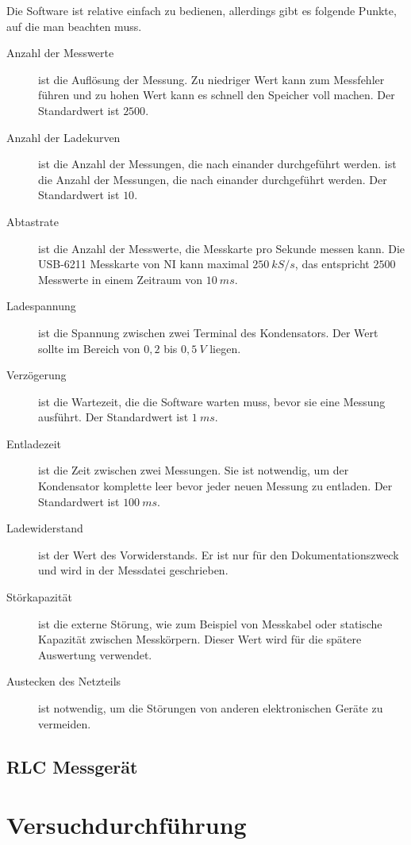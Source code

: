 Die Software ist relative einfach zu bedienen, allerdings gibt es folgende Punkte, auf die man beachten muss.
\begin{description}
    \item[Anzahl der Messwerte] ist die Auflösung der Messung.
        Zu niedriger Wert kann zum Messfehler führen und zu hohen Wert kann es schnell den Speicher voll machen.
        Der Standardwert ist $2500$.

    \item[Anzahl der Ladekurven] ist die Anzahl der Messungen, die nach einander durchgeführt werden. ist die Anzahl der Messungen, die nach einander durchgeführt werden.
        Der Standardwert ist $10$.

    \item[Abtastrate] ist die Anzahl der Messwerte, die Messkarte pro Sekunde messen kann.
        Die USB-6211 Messkarte von NI kann maximal $250 \ kS/s$, das entspricht $2500$ Messwerte in einem Zeitraum von $10 \ ms$.

    \item[Ladespannung] ist die Spannung zwischen zwei Terminal des Kondensators.
        Der Wert sollte im Bereich von $0,2$ bis $0,5 \ V$ liegen.

    \item[Verzögerung] ist die Wartezeit, die die Software warten muss, bevor sie eine Messung ausführt.
        Der Standardwert ist $1 \ ms$.

    \item[Entladezeit] ist die Zeit zwischen zwei Messungen.
        Sie ist notwendig, um der Kondensator komplette leer bevor jeder neuen Messung zu entladen.
        Der Standardwert ist $100 \ ms$.

    \item[Ladewiderstand] ist der Wert des Vorwiderstands.
        Er ist nur für den Dokumentationszweck und wird in der Messdatei geschrieben.

    \item[Störkapazität] ist die externe Störung, wie zum Beispiel von Messkabel oder statische Kapazität zwischen Messkörpern.
        Dieser Wert wird für die spätere Auswertung verwendet.

    \item[Austecken des Netzteils] ist notwendig, um die Störungen von anderen elektronischen Geräte zu vermeiden.
\end{description}

%
\subsection{RLC Messgerät}
\label{sub:rlc_messgeraet}

\section{Versuchdurchführung}
\label{sec:versuchdurchfuehrung}
